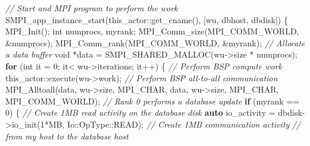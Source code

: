 \documentclass[
]{article}
\newenvironment{Shaded}{}{}
\newcommand{\CommentTok}[1]{\textcolor[rgb]{0.38,0.63,0.69}{\textit{#1}}}
\newcommand{\ControlFlowTok}[1]{\textcolor[rgb]{0.00,0.44,0.13}{\textbf{#1}}}
\newcommand{\DataTypeTok}[1]{\textcolor[rgb]{0.56,0.13,0.00}{#1}}
\newcommand{\DecValTok}[1]{\textcolor[rgb]{0.25,0.63,0.44}{#1}}
\newcommand{\KeywordTok}[1]{\textcolor[rgb]{0.00,0.44,0.13}{\textbf{#1}}}
\newcommand{\NormalTok}[1]{#1}
\newcommand{\OperatorTok}[1]{\textcolor[rgb]{0.40,0.40,0.40}{#1}}
\begin{document}
\begin{Shaded}
\begin{Highlighting}[]
    \CommentTok{// Start and MPI program to perform the work}
\NormalTok{    SMPI\_app\_instance\_start}\OperatorTok{(}\NormalTok{this\_actor}\OperatorTok{::}\NormalTok{get\_cname}\OperatorTok{(),}
    \OperatorTok{[}\NormalTok{wu}\OperatorTok{,}\NormalTok{ dbhost}\OperatorTok{,}\NormalTok{ dbdisk}\OperatorTok{])} \OperatorTok{\{}
\NormalTok{    MPI\_Init}\OperatorTok{();}
    \DataTypeTok{int}\NormalTok{ numprocs}\OperatorTok{,}\NormalTok{ myrank}\OperatorTok{;}
\NormalTok{    MPI\_Comm\_size}\OperatorTok{(}\NormalTok{MPI\_COMM\_WORLD}\OperatorTok{,} \OperatorTok{\&}\NormalTok{numprocs}\OperatorTok{);}
\NormalTok{    MPI\_Comm\_rank}\OperatorTok{(}\NormalTok{MPI\_COMM\_WORLD}\OperatorTok{,} \OperatorTok{\&}\NormalTok{myrank}\OperatorTok{);}
    \CommentTok{// Allocate a data buffer}
    \DataTypeTok{void} \OperatorTok{*}\NormalTok{data }\OperatorTok{=}\NormalTok{ SMPI\_SHARED\_MALLOC}\OperatorTok{(}\NormalTok{wu}\OperatorTok{{-}\textgreater{}}\NormalTok{size }\OperatorTok{*}\NormalTok{ numprocs}\OperatorTok{);}
    \ControlFlowTok{for} \OperatorTok{(}\DataTypeTok{int}\NormalTok{ it }\OperatorTok{=} \DecValTok{0}\OperatorTok{;}\NormalTok{ it}\OperatorTok{\textless{}}\NormalTok{ wu}\OperatorTok{{-}\textgreater{}}\NormalTok{iterations}\OperatorTok{;}\NormalTok{ it}\OperatorTok{++)} \OperatorTok{\{}
    \CommentTok{// Perform BSP compute work}
\NormalTok{    this\_actor}\OperatorTok{::}\NormalTok{execute}\OperatorTok{(}\NormalTok{wu}\OperatorTok{{-}\textgreater{}}\NormalTok{work}\OperatorTok{);}
    \CommentTok{// Perform BSP all{-}to{-}all communication}
\NormalTok{    MPI\_Alltoall}\OperatorTok{(}\NormalTok{data}\OperatorTok{,}\NormalTok{ wu}\OperatorTok{{-}\textgreater{}}\NormalTok{size}\OperatorTok{,}\NormalTok{ MPI\_CHAR}\OperatorTok{,}\NormalTok{ data}\OperatorTok{,}\NormalTok{ wu}\OperatorTok{{-}\textgreater{}}\NormalTok{size}\OperatorTok{,}\NormalTok{ MPI\_CHAR}\OperatorTok{,}\NormalTok{ MPI\_COMM\_WORLD}\OperatorTok{);}
    \CommentTok{// Rank 0 performs a database update}
    \ControlFlowTok{if} \OperatorTok{(}\NormalTok{myrank }\OperatorTok{==} \DecValTok{0}\OperatorTok{)} \OperatorTok{\{}
    \CommentTok{// Create 1MB read activity on the database disk}
    \KeywordTok{auto}\NormalTok{ io\_activity }\OperatorTok{=}
\NormalTok{    dbdisk}\OperatorTok{{-}\textgreater{}}\NormalTok{io\_init}\OperatorTok{(}\DecValTok{1}\OperatorTok{*}\NormalTok{MB}\OperatorTok{,}\NormalTok{ Io}\OperatorTok{::}\NormalTok{OpType}\OperatorTok{::}\NormalTok{READ}\OperatorTok{);}
    \CommentTok{// Create 1MB communication activity}
    \CommentTok{// from my host to the database host}

\end{Highlighting}
\end{Shaded}
\end{document}

